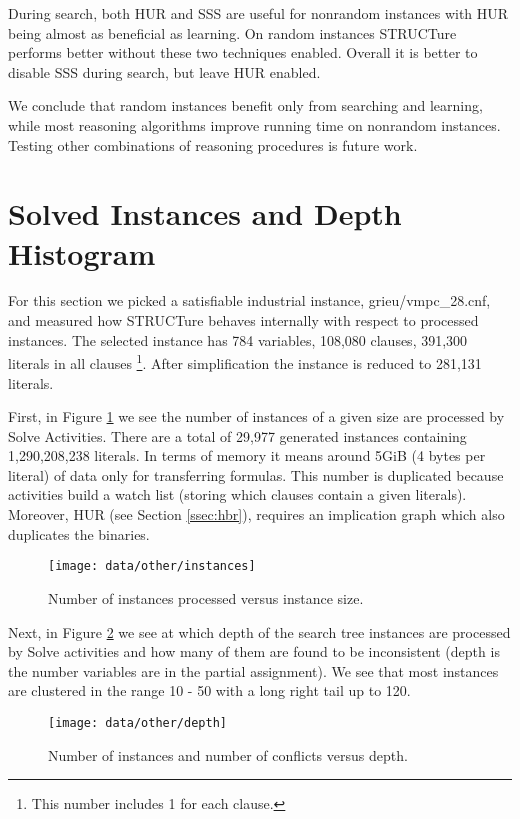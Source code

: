 During search, both HUR and SSS are useful for nonrandom instances
with HUR being almost as beneficial as learning. On random
instances STRUCTure performs better without these two techniques
enabled. Overall it is better to disable SSS during search, but
leave HUR enabled.

We conclude that random instances benefit only from searching and
learning, while most reasoning algorithms improve running time
on nonrandom instances.  Testing other combinations of reasoning
procedures is future work.

\section{Solved Instances and Depth Histogram}
\label{sec:histograms}

For this section we picked a satisfiable industrial instance,
\textsf{grieu/vmpc\_28.cnf}, and measured how STRUCTure behaves
internally with respect to processed instances. The selected
instance has 784 variables, 108,080 clauses, 391,300 literals in all
clauses \footnote{This number includes 1 for each clause.}. After
simplification the instance is reduced to 281,131 literals.

First, in Figure \ref{fig:num-instances} we see the number of
instances of a given size are processed by Solve Activities. There
are a total of 29,977 generated instances containing 1,290,208,238
literals. In terms of memory it means around 5GiB (4 bytes per
literal) of data only for transferring formulas. This number is
duplicated because activities build a watch list (storing which
clauses contain a given literals). Moreover, HUR (see Section
\ref{ssec:hbr}), requires an implication graph which also
duplicates the binaries.

\begin{figure}
  \centering
  \texttt{[image: data/other/instances]}
  \caption{Number of instances processed versus instance size.}
  \label{fig:num-instances}
\end{figure}

Next, in Figure \ref{fig:num-depth} we see at which depth of the
search tree instances are processed by Solve activities and how many
of them are found to be inconsistent (depth is the number variables
are in the partial assignment). We see that most instances are
clustered in the range 10 - 50 with a long right tail up to 120.


\begin{figure}
  \centering
  \texttt{[image: data/other/depth]}
  \caption{Number of instances and number of conflicts versus depth.}
  \label{fig:num-depth}
\end{figure}


